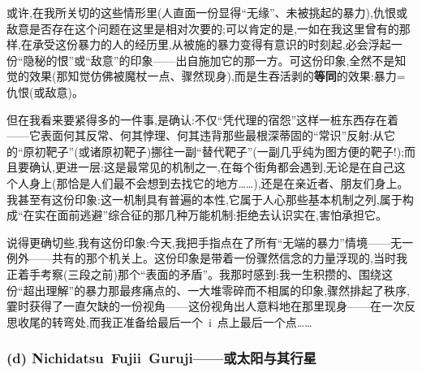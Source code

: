 或许,在我所关切的这些情形里(人直面一份显得“无缘”、未被挑起的暴力),仇恨或敌意是否存在这个问题在这里是相对次要的;可以肯定的是,一如在我这里曾有的那样,在承受这份暴力的人的经历里,从被施的暴力变得有意识的时刻起,必会浮起一份“隐秘的恨”或“敌意”的印象——出自施加它的那一方。可这份印象,全然不是知觉的效果(那知觉仿佛被魔杖一点、骤然现身),而是生吞活剥的\textbf{等同}的效果:暴力=仇恨(或敌意)。

但在我看来要紧得多的一件事,是确认:不仅“凭代理的宿怨”这样一桩东西存在着——它表面何其反常、何其悖理、何其违背那些最根深蒂固的“常识”反射:从它的“原初靶子”\dmark{}(或诸原初靶子)挪往一副“替代靶子”(一副几乎纯为图方便的靶子!);而且要确认,更进一层:这是最常见的机制之一,在每个街角都会遇到,无论是在自己这个人身上(那恰是人们最不会想到去找它的地方……),还是在亲近者、朋友们身上。我甚至有这份印象:这一机制具有普遍的本性,它属于人心那些基本机制之列,属于构成“在实在面前逃避”综合征的那几种万能机制:拒绝去认识实在,害怕承担它。

说得更确切些,我有这份印象:今天,我把手指点在了所有“无端的暴力”情境——无一例外——共有的那个机关上。这份印象是带着一份骤然信念的力量浮现的,当时我正着手考察(三段之前)那个“表面的矛盾”。我那时感到:我一生积攒的、围绕这份“超出理解”的暴力那最疼痛点的、一大堆零碎而不相属的印象,骤然排起了秩序,霎时获得了一直欠缺的一份视角——这份视角出人意料地在那里现身——在一次反思收尾的转弯处,而我正准备给最后一个~i~点上最后一个点……

\subsubsection*{(d) Nichidatsu~Fujii~Guruji——或太阳与其行星}
\label{ch18:local:h74}

\label{ch18:local:n69}

